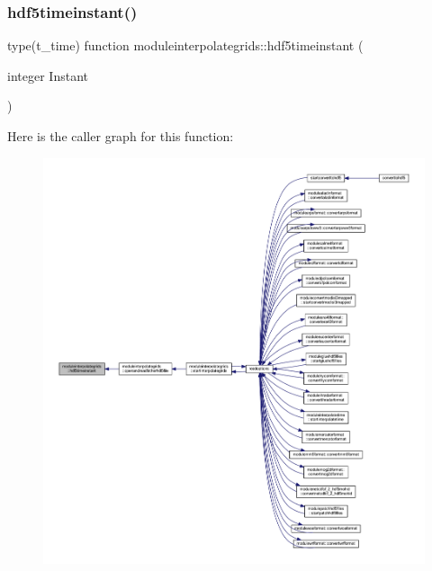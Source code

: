 \subsubsection{\texorpdfstring{hdf5timeinstant()}{hdf5timeinstant()}}
{\footnotesize\ttfamily type(t\+\_\+time) function moduleinterpolategrids\+::hdf5timeinstant (\begin{DoxyParamCaption}\item[{integer}]{Instant }\end{DoxyParamCaption})\hspace{0.3cm}{\ttfamily [private]}}

Here is the caller graph for this function\+:\nopagebreak
\begin{figure}[H]
\begin{center}
\leavevmode
\includegraphics[width=350pt]{namespacemoduleinterpolategrids_aa5a71ded8a9f342c24142a855b130d48_icgraph}
\end{center}
\end{figure}
\mbox{\label{namespacemoduleinterpolategrids_a138eb9151410639c12869a99628fc486}} 

